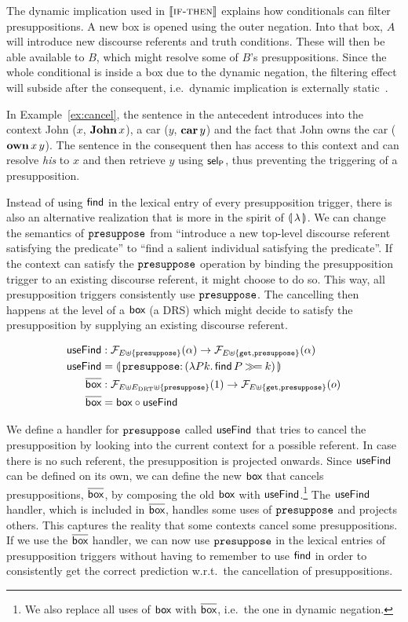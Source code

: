 The dynamic implication used in $\llbracket \textsc{if-then} \rrbracket$ explains how
conditionals can filter presuppositions. A new box is opened using the
outer negation. Into that box, $A$ will introduce new discourse referents
and truth conditions. These will then be able available to $B$, which might
resolve some of $B$'s presuppositions. Since the whole conditional is
inside a box due to the dynamic negation, the filtering effect will subside
after the consequent, i.e.\ dynamic implication is externally
static~\cite{groenendijk1991dynamic}.

In Example~\ref{ex:cancel}, the sentence in the antecedent introduces into
the context John ($x$, $\textbf{John}\,x$), a car ($y$,
$\textbf{car}\,y$) and the fact that John owns the car
($\textbf{own}\,x\,y$). The sentence in the consequent then has access
to this context and can resolve \emph{his} to $x$ and then retrieve $y$
using $\textsf{sel}_{\textsf{P}}$, thus preventing the triggering of a presupposition.

Instead of using $\textsf{find}$ in the lexical entry of every presupposition
trigger, there is also an alternative realization that is more in the
spirit of $\llparenthesis \, \lambda \, \rrparenthesis$. We can change the semantics of
$\mathtt{presuppose}$ from ``introduce a new top-level discourse referent
satisfying the predicate'' to ``find a salient individual satisfying the
predicate''. If the context can satisfy the $\mathtt{presuppose}$ operation by
binding the presupposition trigger to an existing discourse referent, it
might choose to do so. This way, all presupposition triggers consistently
use $\mathtt{presuppose}$. The cancelling then happens at the level of a $\textsf{box}$
(a DRS) which might decide to satisfy the presupposition by supplying an
existing discourse referent.

\begin{align*}
  \useFind &: \FF_{E \uplus \{\op{presuppose}\}}(\alpha) \to \FF_{E \uplus \{\op{get}, \op{presuppose}\}}(\alpha) \\
  \useFind &= \banana{\onto{\op{presuppose}}{(\lam{P k}{\ap{\find}{P} \hsbind k})}} \\
  \DBOX &: \FF_{E \uplus E_\DRT \uplus \{\op{presuppose}\}}(1) \to \FF_{E \uplus \{\op{get}, \op{presuppose}\}}(o) \\
  \DBOX &= \BOX \circ \useFind
\end{align*}

We define a handler for $\mathtt{presuppose}$ called $\textsf{useFind}$ that tries to
cancel the presupposition by looking into the current context for a
possible referent. In case there is no such referent, the presupposition is
projected onwards. Since $\textsf{useFind}$ can be defined on its own, we can
define the new $\textsf{box}$ that cancels presuppositions, $\overline{\textsf{box}}$, by composing
the old $\textsf{box}$ with $\textsf{useFind}$.\footnote{We also replace all uses of $\textsf{box}$
  with $\overline{\textsf{box}}$, i.e.\ the one in dynamic negation.} The $\textsf{useFind}$ handler,
which is included in $\overline{\textsf{box}}$, handles some uses of $\mathtt{presuppose}$ and
projects others. This captures the reality that some contexts cancel some
presuppositions. If we use the $\overline{\textsf{box}}$ handler, we can now use
$\mathtt{presuppose}$ in the lexical entries of presupposition triggers without
having to remember to use $\textsf{find}$ in order to consistently get the correct
prediction w.r.t.\ the cancellation of presuppositions.

